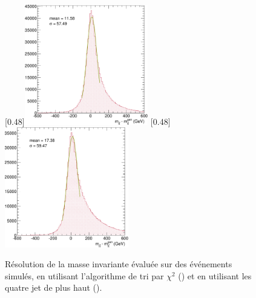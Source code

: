 \begin{figure}[tbp] \centering
    \subcaptionbox{\label{fig:mtt_reso_chi2}}[0.48\textwidth]{\includegraphics[width=0.48\textwidth]{chapitre6/figs/mtt_resolution_chi2.pdf}} \hfill
    \subcaptionbox{\label{fig:mtt_reso_four_jets}}[0.48\textwidth]{\includegraphics[width=0.48\textwidth]{chapitre6/figs/mtt_resolution_four_jets.pdf}}
    \caption{Résolution de la masse invariante \mtt évaluée sur des événements \ttbar simulés, en utilisant l'algorithme de tri par $\chi^2$ () et en utilisant les quatre jet de plus haut \pt ().}
\end{figure}

